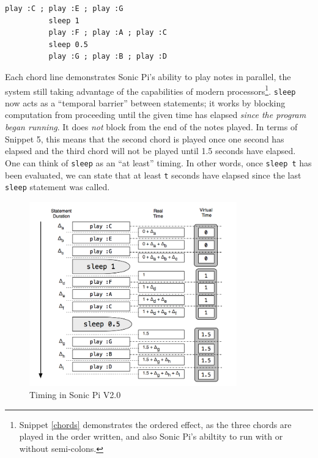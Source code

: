 \documentclass[11pt, abstracton, twoside, titlepage=true]{scrartcl}
\begin{document}
\begin{minipage}{\textwidth}
	\begin{lstlisting}[style = sonicpi]
		  play :C ; play :E ; play :G
		  sleep 1
		  play :F ; play :A ; play :C
		  sleep 0.5
		  play :G ; play :B ; play :D
	\end{lstlisting}
	 \label{chords}
\end{minipage}

Each chord line demonstrates Sonic Pi's ability to play notes in parallel, the 
system still taking advantage of the capabilities of modern processors\footnote{
Snippet \ref{chords} demonstrates the ordered effect, as the three chords are 
played in the order written, and also Sonic Pi's abiltity to run with or without 
semi-colons.}. \texttt{sleep} now acts as a ``temporal barrier'' between 
statements; it works by blocking computation from proceeding until the given time 
has elapsed \emph{since the program began running}. It does \emph{not} block from 
the end of the notes played. In terms of Snippet 5, this means that the second 
chord is played once one second has elapsed and the third chord will not be played 
until 1.5 seconds have elapsed. One can think of \texttt{sleep} as an ``at 
least'' timing. In other words, once \texttt{sleep t} has been evaluated, we 
can state that at least \texttt{t} seconds have elapsed since the last \texttt{
sleep} statement was called. 

\begin{figure}[ht]
	\centering
	\includegraphics[width=0.8\textwidth]{images/sonic-two.png}
	\caption{Timing in Sonic Pi V2.0 \cite{AOB14}}
\end{figure}
\end{document}
